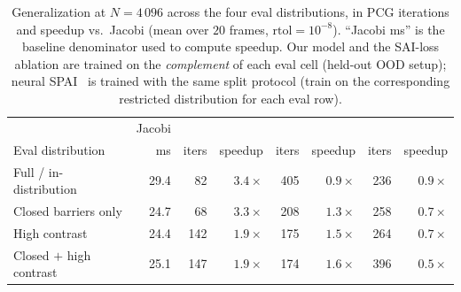 \documentclass[acmtog]{acmart}
\theoremstyle{plain}
\begin{document}
\begin{table}[t]
\centering
\caption{Generalization at $N\!=\!4\,096$ across the four eval distributions, in
PCG iterations and speedup vs.\ Jacobi (mean over $20$ frames,
$\mathrm{rtol}\!=\!10^{-8}$). ``Jacobi ms'' is the baseline denominator used to
compute speedup. Our model and the SAI-loss ablation are trained on the
\emph{complement} of each eval cell (held-out OOD setup); neural
SPAI~\cite{Yang2025sparse} is trained with the same split protocol
(train on the corresponding restricted distribution for each eval row).}
\label{tab:generalization-vs-baselines}
\scriptsize\setlength{\tabcolsep}{3pt}
\begin{tabular}{@{}l r rr rr rr@{}}
\toprule
& Jacobi
& 
& 
&  \\
\cmidrule(lr){2-2}\cmidrule(lr){3-4}\cmidrule(lr){5-6}\cmidrule(lr){7-8}
Eval distribution         & ms & iters & speedup & iters & speedup & iters & speedup \\
\midrule
Full / in-distribution    & 29.4 & 82  & \textbf{$3.4\times$} & 405 & $0.9\times$ & 236 & $0.9\times$ \\
Closed barriers only      & 24.7 & 68  & \textbf{$3.3\times$} & 208 & $1.3\times$ & 258 & $0.7\times$ \\
High contrast             & 24.4 & 142 & \textbf{$1.9\times$} & 175 & $1.5\times$ & 264 & $0.7\times$ \\
Closed $+$ high contrast  & 25.1 & 147 & \textbf{$1.9\times$} & 174 & $1.6\times$ & 396 & $0.5\times$ \\
\bottomrule
\end{tabular}
\end{table}
\end{document}

